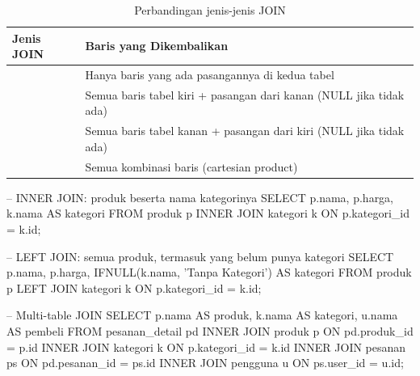 \begin{table}[H]
\centering
\begin{tabular}{|P{3cm}|P{9.5cm}|}
\hline
\textbf{Jenis JOIN} & \textbf{Baris yang Dikembalikan} \\
\hline
{} & Hanya baris yang ada pasangannya di kedua tabel \\
\hline
{} & Semua baris tabel kiri + pasangan dari kanan (NULL jika tidak ada) \\
\hline
{} & Semua baris tabel kanan + pasangan dari kiri (NULL jika tidak ada) \\
\hline
{} & Semua kombinasi baris (cartesian product) \\
\hline
\end{tabular}
\caption{Perbandingan jenis-jenis JOIN}
\end{table}

\begin{webcode}[language=SQL, caption={Contoh penggunaan JOIN}]
-- INNER JOIN: produk beserta nama kategorinya
SELECT p.nama, p.harga, k.nama AS kategori
FROM produk p
INNER JOIN kategori k ON p.kategori_id = k.id;

-- LEFT JOIN: semua produk, termasuk yang belum punya kategori
SELECT p.nama, p.harga, IFNULL(k.nama, 'Tanpa Kategori') AS kategori
FROM produk p
LEFT JOIN kategori k ON p.kategori_id = k.id;

-- Multi-table JOIN
SELECT p.nama AS produk, k.nama AS kategori, u.nama AS pembeli
FROM pesanan_detail pd
INNER JOIN produk p ON pd.produk_id = p.id
INNER JOIN kategori k ON p.kategori_id = k.id
INNER JOIN pesanan ps ON pd.pesanan_id = ps.id
INNER JOIN pengguna u ON ps.user_id = u.id;
\end{webcode}

